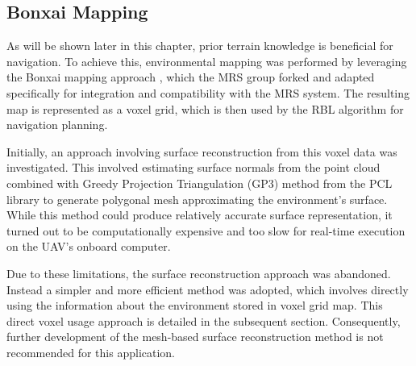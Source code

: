         \subsection{Bonxai Mapping}
            As will be shown later in this chapter, prior terrain knowledge is beneficial for navigation. 
            To achieve this, environmental mapping was performed by leveraging the Bonxai mapping approach \cite{Bonxai2025}, which the \ac{MRS} group forked and adapted specifically for integration and compatibility with the \ac{MRS} system. 
            The resulting map is represented as a voxel grid, which is then used by the \ac{RBL} algorithm for navigation planning.

            Initially, an approach involving surface reconstruction from this voxel data was investigated. 
            This involved estimating surface normals from the point cloud combined with Greedy Projection Triangulation (GP3) method from the PCL library to generate polygonal mesh approximating the environment's surface.
            While this method could produce relatively accurate surface representation, it turned out to be computationally expensive and too slow for real-time execution on the \ac{UAV}'s onboard computer.

            Due to these limitations, the surface reconstruction approach was abandoned. 
            Instead a simpler and more efficient method was adopted, which involves directly using the information about the environment stored in voxel grid map.
            This direct voxel usage approach is detailed in the subsequent section. 
            Consequently, further development of the mesh-based surface reconstruction method is not recommended for this application.

